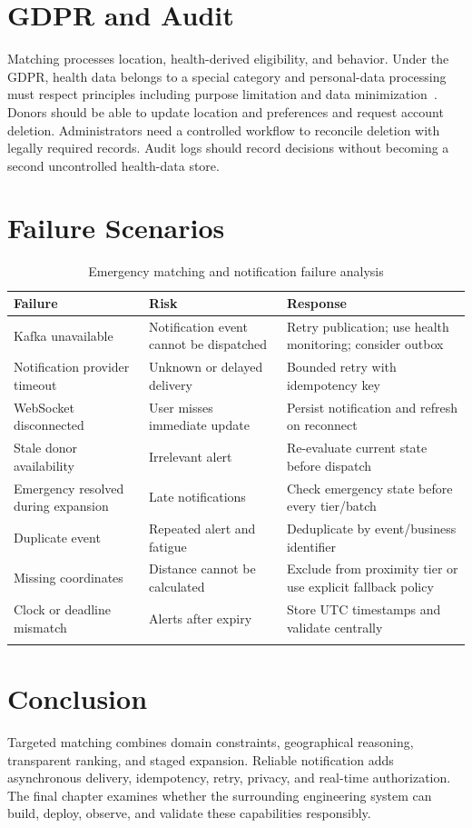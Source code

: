 \section{GDPR and Audit}
Matching processes location, health-derived eligibility, and behavior. Under the GDPR, health data belongs to a special category and personal-data processing must respect principles including purpose limitation and data minimization~\cite{gdpr}. Donors should be able to update location and preferences and request account deletion. Administrators need a controlled workflow to reconcile deletion with legally required records. Audit logs should record decisions without becoming a second uncontrolled health-data store.

\section{Failure Scenarios}
\begin{longtable}{|P{3.4cm}|P{5.1cm}|P{4.9cm}|}
\hline
{}\textbf{Failure} & \textbf{Risk} & \textbf{Response}\\ \hline
Kafka unavailable & Notification event cannot be dispatched & Retry publication; use health monitoring; consider outbox\\ \hline
Notification provider timeout & Unknown or delayed delivery & Bounded retry with idempotency key\\ \hline
WebSocket disconnected & User misses immediate update & Persist notification and refresh on reconnect\\ \hline
Stale donor availability & Irrelevant alert & Re-evaluate current state before dispatch\\ \hline
Emergency resolved during expansion & Late notifications & Check emergency state before every tier/batch\\ \hline
Duplicate event & Repeated alert and fatigue & Deduplicate by event/business identifier\\ \hline
Missing coordinates & Distance cannot be calculated & Exclude from proximity tier or use explicit fallback policy\\ \hline
Clock or deadline mismatch & Alerts after expiry & Store UTC timestamps and validate centrally\\ \hline
\caption{Emergency matching and notification failure analysis}
\label{tab:matching-failures}
\end{longtable}

\section*{Conclusion}
Targeted matching combines domain constraints, geographical reasoning, transparent ranking, and staged expansion. Reliable notification adds asynchronous delivery, idempotency, retry, privacy, and real-time authorization. The final chapter examines whether the surrounding engineering system can build, deploy, observe, and validate these capabilities responsibly.
